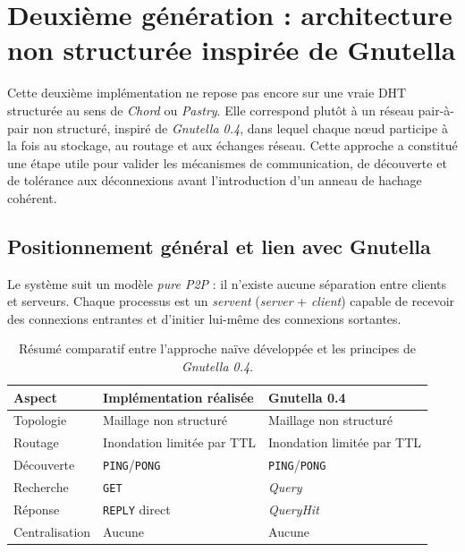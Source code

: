 \newpage
\section{Deuxième génération : architecture non structurée inspirée de Gnutella}

Cette deuxième implémentation ne repose pas encore sur une vraie DHT structurée au sens de \textit{Chord} ou \textit{Pastry}. Elle correspond plutôt à un réseau pair-à-pair non structuré, inspiré de \textit{Gnutella 0.4}, dans lequel chaque n\oe ud participe à la fois au stockage, au routage et aux échanges réseau. Cette approche a constitué une étape utile pour valider les mécanismes de communication, de découverte et de tolérance aux déconnexions avant l'introduction d'un anneau de hachage cohérent.

\subsection{Positionnement général et lien avec Gnutella}

Le système suit un modèle \textit{pure P2P} : il n'existe aucune séparation entre clients et serveurs. Chaque processus est un \textit{servent} (\textit{server} + \textit{client}) capable de recevoir des connexions entrantes et d'initier lui-même des connexions sortantes.

\begin{table}[htbp]
    \centering
    \begin{tabular}{|l|l|l|}
        \hline
        \textbf{Aspect} & \textbf{Implémentation réalisée} & \textbf{Gnutella 0.4} \\
        \hline
        Topologie & Maillage non structuré & Maillage non structuré \\
        \hline
        Routage & Inondation limitée par TTL & Inondation limitée par TTL \\
        \hline
        Découverte & \texttt{PING}/\texttt{PONG} & \texttt{PING}/\texttt{PONG} \\
        \hline
        Recherche & \texttt{GET} & \textit{Query} \\
        \hline
        Réponse & \texttt{REPLY} direct & \textit{QueryHit} \\
        \hline
        Centralisation & Aucune & Aucune \\
        \hline
    \end{tabular}
    \caption{Résumé comparatif entre l'approche naïve développée et les principes de \textit{Gnutella 0.4}.}
    \label{tab:naive_dht_vs_gnutella}
\end{table}

